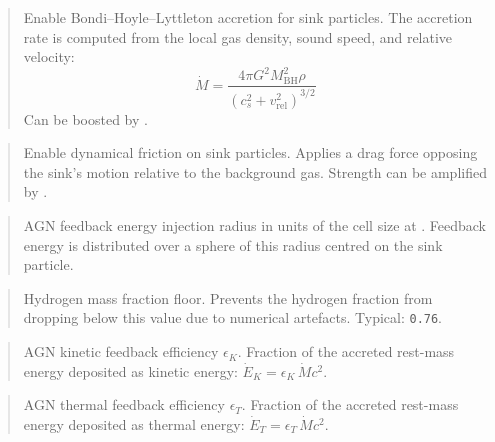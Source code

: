 \begin{quote}
Enable Bondi--Hoyle--Lyttleton accretion for sink particles.  The
accretion rate is computed from the local gas density, sound speed,
and relative velocity:
\[
  \dot{M} = \frac{4\pi G^2 M_{\text{BH}}^2 \rho}%
             {(c_s^2 + v_{\text{rel}}^2)^{3/2}}
\]
Can be boosted by .
\end{quote}

\label{param:drag}

\begin{quote}
Enable dynamical friction on sink particles.  Applies a drag force
opposing the sink's motion relative to the background gas.  Strength
can be amplified by .
\end{quote}

\label{param:rAGN}

\begin{quote}
AGN feedback energy injection radius in units of the cell size at
.  Feedback energy is distributed over a sphere
of this radius centred on the sink particle.
\end{quote}

\label{param:X_floor}

\begin{quote}
Hydrogen mass fraction floor.  Prevents the hydrogen fraction from
dropping below this value due to numerical artefacts.  Typical:
\texttt{0.76}.
\end{quote}

\label{param:eAGN_K}

\begin{quote}
AGN kinetic feedback efficiency $\epsilon_K$.  Fraction of the
accreted rest-mass energy deposited as kinetic energy:
$\dot{E}_K = \epsilon_K \, \dot{M} c^2$.
\end{quote}

\label{param:eAGN_T}

\begin{quote}
AGN thermal feedback efficiency $\epsilon_T$.  Fraction of the
accreted rest-mass energy deposited as thermal energy:
$\dot{E}_T = \epsilon_T \, \dot{M} c^2$.
\end{quote}

